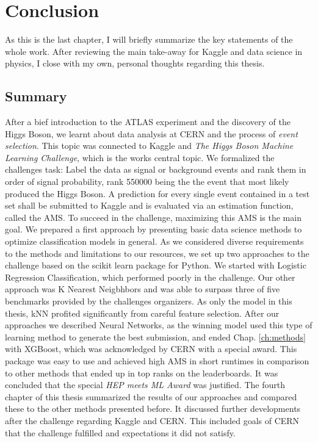 \section{Conclusion}\label{ch:conc}
As this is the last chapter, I will briefly summarize the key statements of the whole work.
After reviewing the main take-away for Kaggle and data science in physics, I close with my own, personal thoughts regarding this thesis.

\subsection{Summary}
After a bief introduction to the ATLAS experiment and the discovery of the Higgs Boson, we learnt about data analysis at CERN and the process of \emph{event selection}. This topic was connected to Kaggle and \emph{The Higgs Boson Machine Learning Challenge}, which is the works central topic.
We formalized the challenges task: Label the data as signal or background events and rank them in order of signal probability, rank 550000 being the the event that most likely produced the Higgs Boson. A prediction for every single event contained in a test set shall be submitted to Kaggle and is evaluated via an estimation function, called the AMS. To succeed in the challenge, maximizing this AMS is the main goal.
We prepared a first approach by presenting basic data science methods to optimize classification models in general. As we considered diverse requirements to the methods and limitations to our resources, we set up two approaches to the challenge based on the scikit learn package for Python. We started with Logistic Regression Classification, which performed poorly in the challenge. Our other approach was K Nearest Neigbhbors and was able to surpass three of five benchmarks provided by the challenges organizers. As only the  model in this thesis, kNN profited significantly from careful feature selection.
After our approaches we described Neural Networks, as the winning model used this type of learning method to generate the best submission, and ended Chap. \ref{ch:methods} with XGBoost, which was acknowledged by CERN with a special award. This package was easy to use and achieved high AMS in short runtimes in comparison to other methods that ended up in top ranks on the leaderboards. It was concluded that the special \emph{HEP meets ML Award} was justified.
The fourth chapter of this thesis summarized the results of our approaches and compared these to the other methods presented before. It discussed further developments after the challenge regarding Kaggle and CERN. This included goals of CERN that the challenge fulfilled and expectations it did not satisfy.

